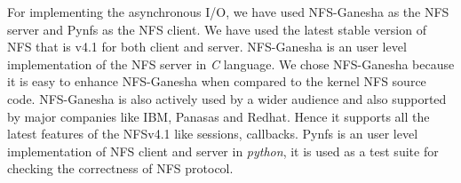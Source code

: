 For implementing the asynchronous I/O, we have used NFS-Ganesha \cite{ganesha} as the NFS server and Pynfs \cite{pynfs} as the NFS client. We have used the latest stable version of NFS that is v4.1 for both client and server. NFS-Ganesha is an user level implementation of the NFS server in \textit{C} language. We chose NFS-Ganesha because it is easy to enhance NFS-Ganesha when compared to the kernel NFS source code. NFS-Ganesha is also actively used by a wider audience and also supported by major companies like IBM, Panasas and Redhat. Hence it supports all the latest features of the NFSv4.1 like sessions, callbacks. Pynfs is an user level implementation of NFS client and server in \textit{python}, it is used as a test suite for checking the correctness of NFS protocol.

